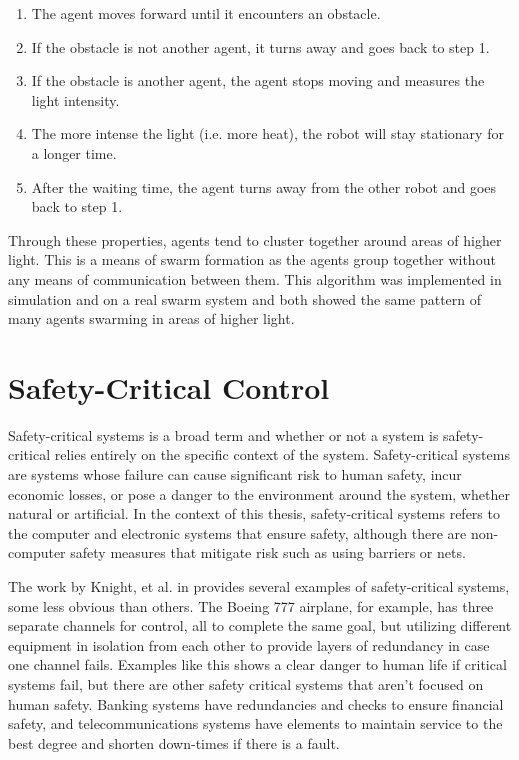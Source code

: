 \begin{enumerate}
    \item The agent moves forward until it encounters an obstacle.
    \item If the obstacle is not another agent, it turns away and goes back to step 1.
    \item If the obstacle is another agent, the agent stops moving and measures the light intensity.
    \item The more intense the light (i.e. more heat), the robot will stay stationary for a longer time.
    \item After the waiting time, the agent turns away from the other robot and goes back to step 1.
\end{enumerate}

Through these properties, agents tend to cluster together around areas of higher light. This is a means of swarm formation as the agents group together without any means of communication between them. This algorithm was implemented in simulation and on a real swarm system and both showed the same pattern of many agents swarming in areas of higher light.

\section{Safety-Critical Control}

Safety-critical systems is a broad term and whether or not a system is safety-critical relies entirely on the specific context of the system. Safety-critical systems are systems whose failure can cause significant risk to human safety, incur economic losses, or pose a danger to the environment around the system, whether natural or artificial. In the context of this thesis, safety-critical systems refers to the computer and electronic systems that ensure safety, although there are non-computer safety measures that mitigate risk such as using barriers or nets. 

The work by Knight, et al. in \cite{knight2002safety} provides several examples of safety-critical systems, some less obvious than others. The Boeing 777 airplane, for example, has three separate channels for control, all to complete the same goal, but utilizing different equipment in isolation from each other to provide layers of redundancy in case one channel fails. Examples like this shows a clear danger to human life if critical systems fail, but there are other safety critical systems that aren't focused on human safety. Banking systems have redundancies and checks to ensure financial safety, and telecommunications systems have elements to maintain service to the best degree and shorten down-times if there is a fault.

